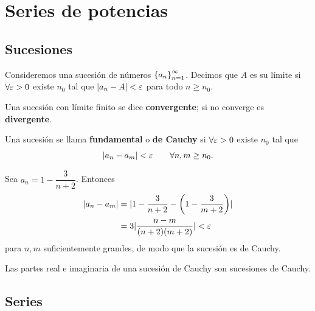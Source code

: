 \section{Series de potencias}
\label{sec:series_potencia}

\subsection{Sucesiones}
\label{subsec:sucesiones}

Consideremos una sucesi\'on de n\'umeros $\left\{ a_n \right\}_{n=1}^{\infty}$. Decimos
que $A$ es su l\'imite si $\forall\varepsilon>0$ existe $n_0$ tal que
$\lvert a_n-A \rvert<\varepsilon$ para todo $n\ge n_0$.

\begin{definicion}[Convergencia]
  \label{def:convergencia}
  Una sucesi\'on con l\'imite finito se dice \textbf{convergente}; si no
  converge es \textbf{divergente}.
\end{definicion}

\begin{definicion}
  \label{def:cauchy}
  Una sucesi\'on se llama \textbf{fundamental} o \textbf{de Cauchy} si
  $\forall\varepsilon>0$ existe $n_0$ tal que
  \begin{equation}
    \label{eq:cauchy}
    \lvert a_n-a_m \rvert<\varepsilon
    \qquad\forall n,m\ge n_0 .
  \end{equation}
\end{definicion}

\begin{ejemplo}
  \label{ej:sucesion_cauchy}
  Sea $a_n=1-\dfrac{3}{n+2}$. Entonces
  \begin{equation}
    \label{eq:ejemplo_cauchy}
    \begin{aligned}
      \lvert a_n-a_m \rvert
        &=\lvert 1-\frac{3}{n+2}-\left( 1-\frac{3}{m+2} \right) \rvert\\
        &=3\lvert \frac{n-m}{(n+2)(m+2)} \rvert<\varepsilon
    \end{aligned}
  \end{equation}
  para $n,m$ suficientemente grandes, de modo que la sucesi\'on es de Cauchy.
\end{ejemplo}

\begin{observacion}
  Las partes real e imaginaria de una sucesi\'on de Cauchy son sucesiones de
  Cauchy.
\end{observacion}

\subsection{Series}
\label{subsec:series}

